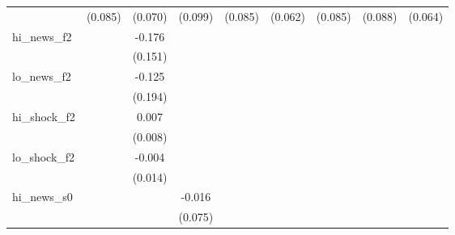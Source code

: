{\begin{tabular}{l*{8}{c}}
            &     (0.085)         &     (0.070)         &     (0.099)         &     (0.085)         &     (0.062)         &     (0.085)         &     (0.088)         &     (0.064)         \\
\addlinespace
hi\_news\_f2  &                     &      -0.176         &                     &                     &                     &                     &                     &                     \\
            &                     &     (0.151)         &                     &                     &                     &                     &                     &                     \\
\addlinespace
lo\_news\_f2  &                     &      -0.125         &                     &                     &                     &                     &                     &                     \\
            &                     &     (0.194)         &                     &                     &                     &                     &                     &                     \\
\addlinespace
hi\_shock\_f2 &                     &       0.007         &                     &                     &                     &                     &                     &                     \\
            &                     &     (0.008)         &                     &                     &                     &                     &                     &                     \\
\addlinespace
lo\_shock\_f2 &                     &      -0.004         &                     &                     &                     &                     &                     &                     \\
            &                     &     (0.014)         &                     &                     &                     &                     &                     &                     \\
\addlinespace
hi\_news\_s0  &                     &                     &      -0.016         &                     &                     &                     &                     &                     \\
            &                     &                     &     (0.075)         &                     &                     &                     &                     &                     \\

\end{tabular}}
